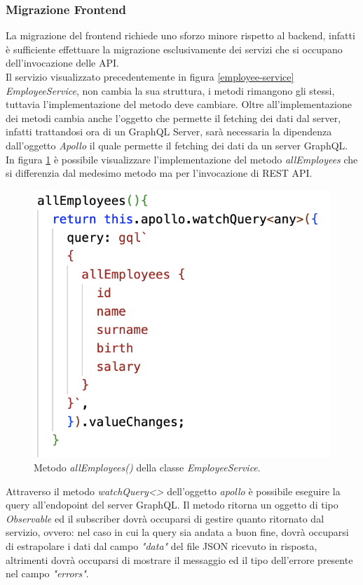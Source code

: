 \subsubsection*{Migrazione Frontend}
La migrazione del frontend richiede uno sforzo minore rispetto al backend, infatti è sufficiente effettuare la migrazione esclusivamente dei servizi che si occupano dell'invocazione delle API.\\
Il servizio visualizzato precedentemente in figura \ref{employee-service} \textit{EmployeeService}, non cambia la sua struttura, i metodi rimangono gli stessi, tuttavia l'implementazione del metodo deve cambiare. Oltre all'implementazione dei metodi cambia anche l'oggetto che permette il fetching dei dati dal server, infatti trattandosi ora di un GraphQL Server, sarà necessaria la dipendenza dall'oggetto \textit{Apollo} il quale permette il fetching dei dati da un server GraphQL.\\
In figura \ref{employee-service-method-graphql} è possibile visualizzare l'implementazione del metodo  \textit{allEmployees} che si differenzia dal medesimo metodo ma per l'invocazione di REST API.
\FloatBarrier
\begin{figure}[!ht]
\centering
\includegraphics[width=0.5\linewidth]{immagini/employeeServiceMethodGraphql.png}
\caption{Metodo \textit{allEmployees()} della classe  \textit{EmployeeService}.}
\label{employee-service-method-graphql}
\end{figure}
\FloatBarrier
Attraverso il metodo \textit{watchQuery<>} dell'oggetto \textit{apollo} è possibile eseguire la query all'endopoint del server GraphQL. Il metodo ritorna un oggetto di tipo \textit{Observable} ed il subscriber dovrà occuparsi di gestire quanto ritornato dal servizio, ovvero: nel caso in cui la query sia andata a buon fine, dovrà occuparsi di estrapolare i dati dal campo \textit{"data"} del file JSON ricevuto in risposta, altrimenti dovrà occuparsi di mostrare il messaggio ed il tipo dell'errore presente nel campo \textit{"errors"}.

